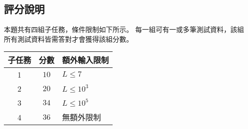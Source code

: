 \subsection{評分說明}

本題共有四組子任務，條件限制如下所示。
每一組可有一或多筆測試資料，該組所有測試資料皆需答對才會獲得該組分數。

\begin{longtable}[]{@{}ccl@{}}
\toprule
子任務 & 分數 & 額外輸入限制 \\
\midrule
\endhead
1 & \(10\) & \begin{math}L \le 7\end{math} \\
2 & \(20\) & \begin{math}L \le 10^3\end{math} \\
3 & \(34\) & \begin{math}L \le 10^5\end{math} \\
4 & \(36\) & 無額外限制 \\
\bottomrule
\end{longtable}
